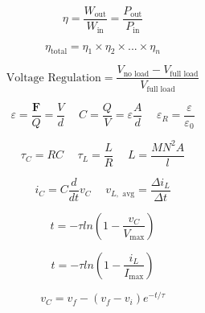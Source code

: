 \documentclass[twocolumn, 12pt]{article}
\begin{document}
{        \begin{equation*}
            \eta=\frac{W_{\text{out}}}{W_{\text{in}}}=\frac{P_{\text{out}}}{P_{\text{in}}} 
        \end{equation*}
        
        \begin{equation*}
            \eta_{\text{total}}=\eta_1\times \eta_2\times ...\times \eta_n 
        \end{equation*}
        
        \begin{equation*}
            \text{Voltage Regulation}=\frac{V_{\text{no load}}-V_{\text{full load}}} {V_{\text{full load}}}
        \end{equation*}
        
        \begin{equation*}
            \varepsilon =\frac{\textbf{F}}{Q} =\frac{V}{d} \hspace{15pt}  C=\frac{Q}{V}=\varepsilon \frac{A}{d}  \hspace{15pt} \varepsilon_R=\frac{\varepsilon}{\varepsilon_0}
        \end{equation*}
        
        \begin{equation*}
            \tau_C=RC \hspace{15pt} \tau_L=\frac{L}{R} \hspace{15pt} L=\frac{MN^2A}{l}
        \end{equation*}
        
        \begin{equation*}
            i_C=C\frac{d}{dt} v_C \hspace{15pt} v_{L,\text{ avg}}=\frac{\Delta i_L}{\Delta t}
        \end{equation*}
        
        \begin{equation*}
            t=-\tau ln \left(1-\frac{v_C}{V_{\text{max}}}\right) 
        \end{equation*}
        
        \begin{equation*}
            t=-\tau ln \left(1-\frac{i_L}{I_{\text{max}}}\right)
        \end{equation*}
        
        \begin{equation*}
            v_C=v_f-(v_f-v_i)e^{-t/\tau}
        \end{equation*}
        
}
\end{document}
